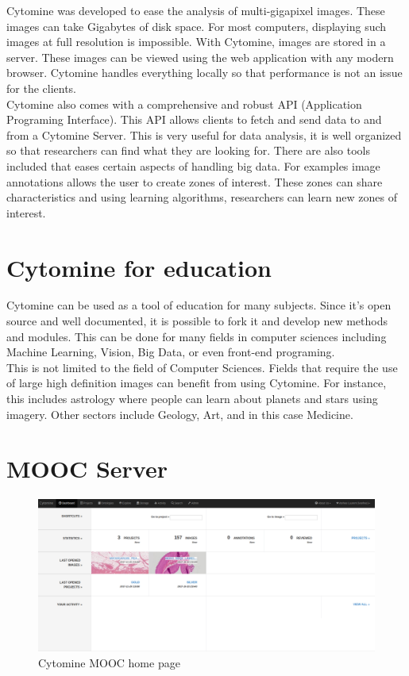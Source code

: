 \documentclass[a4paper,11pt]{report}
\numberwithin{figure}{section} %
\begin{document}
Cytomine was developed to ease the analysis of multi-gigapixel images.
These images can take Gigabytes of disk space.
For most computers, displaying such images at full resolution is impossible.
With Cytomine, images are stored in a server.
These images can be viewed using the web application with any modern browser.
Cytomine handles everything locally so that performance is not an issue for the clients.\\

	Cytomine also comes with a comprehensive and robust API (Application Programing Interface).
	This API allows clients to fetch and send data to and from a Cytomine Server.
	This is very useful for data analysis, it is well organized so that researchers can find what they are looking for.
	There are also tools included that eases certain aspects of handling big data.
	For examples image annotations allows the user to create zones of interest.
	These zones can share characteristics and using learning algorithms, researchers can learn new zones of interest.

\section{Cytomine for education}

Cytomine can be used as a tool of education for many subjects.
Since it's open source and well documented, it is possible to fork it and develop new methods and modules.
This can be done for many fields in computer sciences including Machine Learning, Vision, Big Data, or even front-end programing.\\

This is not limited to the field of Computer Sciences.
Fields that require the use of large high definition images can benefit from using Cytomine.
For instance, this includes astrology where people can learn about planets and stars using imagery.
Other sectors include Geology, Art, and in this case Medicine.


\section{MOOC Server}

      \begin{figure}[H]
      \centering
      \includegraphics[width=.95\linewidth]{images/cytomine_home.png}
      \caption{Cytomine MOOC home page}
      \end{figure}
\end{document}
